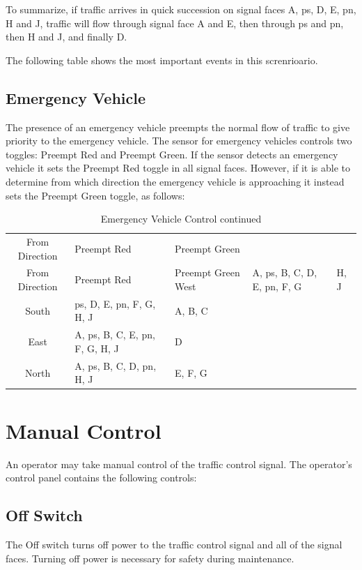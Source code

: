 \documentclass[letterpaper,twoside]{article}
\begin{document}
To summarize, if traffic arrives in quick succession on signal faces
A, ps, D, E, pn, H and J, traffic will flow through signal face
A and E, then through ps and pn, then H and J, and finally D.

The following table shows the most important events in this screnrioario.



\subsection{Emergency Vehicle}

The presence of an emergency vehicle preempts the normal flow of traffic
to give priority to the emergency vehicle. The sensor for emergency
vehicles controls two toggles: Preempt Red and Preempt Green.
If the sensor detects an emergency
vehicle it sets the Preempt Red toggle in all signal faces.
However, if it is able to determine from which direction the emergency vehicle
is approaching it instead sets the Preempt Green toggle, as follows:

\begin{longtable}{c | l | l}
  \caption{Emergency Vehicle control} \\
  From Direction & Preempt Red & Preempt Green \endfirsthead
  \caption{Emergency Vehicle Control continued} \\
  From Direction & Preempt Red & Preempt Green \endhead
  \hline West & A, ps, B, C, D, E, pn, F, G & H, J \\
  \hline South & ps, D, E, pn, F, G, H, J & A, B, C \\
  \hline East & A, ps, B, C, E, pn, F, G, H, J & D \\
  \hline North & A, ps, B, C, D, pn, H, J & E, F, G \\
  \hline
\end{longtable}

\section{Manual Control}

An operator may take manual control of the traffic control signal.
The operator's control panel contains the following controls:

\subsection{Off Switch}
The Off switch turns off power to the traffic control signal and all
of the signal faces.  Turning off power is necessary for safety during
maintenance.
\end{document}
